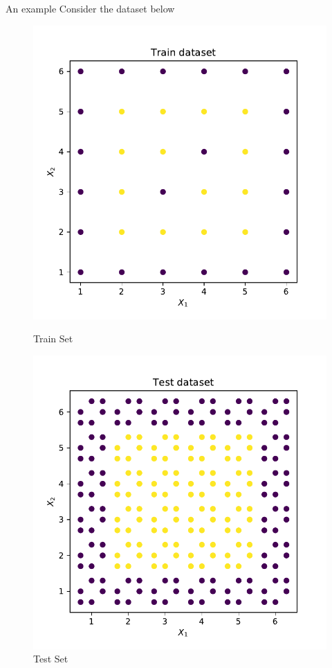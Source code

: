 \documentclass{beamer}
\begin{document}
	\begin{frame}{An example}
	Consider the dataset below
	\begin{figure}[h]
	    \centering
	    \begin{minipage}{0.45\textwidth}
	        \centering
	        \includegraphics[width=\textwidth]{dataset-2-train}
	        \caption{Train Set}
	    \end{minipage}
	    \hfill
	    \begin{minipage}{0.45\textwidth}
	        \centering
	        \includegraphics[width=\textwidth]{dataset-2-test}
	        \caption{Test Set}
	    \end{minipage}
	\end{figure}
	\end{frame}
\end{document}
